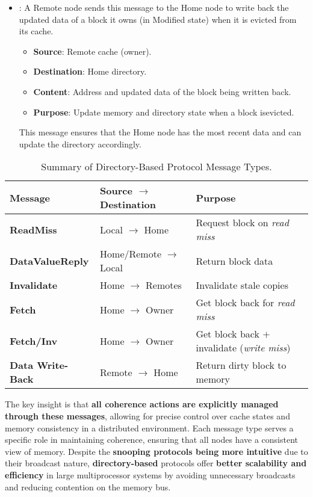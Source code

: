 \begin{itemize}
    \item {}: A Remote node sends this message to the Home node to write back the updated data of a block it owns (in Modified state) when it is evicted from its cache.
    \begin{itemize}
        \item[\textcolor{Green3}{\faIcon{arrow-right}}] \textcolor{Green3}{\textbf{Source}}: Remote cache (owner).
        \item[\textcolor{Green3}{\faIcon{arrow-left}}] \textcolor{Green3}{\textbf{Destination}}: Home directory.
        \item[\textcolor{Green3}{\faIcon{file-alt}}] \textcolor{Green3}{\textbf{Content}}: Address and updated data of the block being written back.
        \item[\textcolor{Green3}{\faIcon{question-circle}}] \textcolor{Green3}{\textbf{Purpose}}: Update memory and directory state when a block is\break evicted.
    \end{itemize}
    This message ensures that the Home node has the most recent data and can update the directory accordingly.
\end{itemize}

\begin{table}[!htp]
    \centering
    \begin{tabular}{@{} l l p{10em} @{}}
        \toprule
        Message                     & Source $\to$ Destination  & Purpose \\
        \midrule
        \textbf{ReadMiss}           & Local $\to$ Home          & Request block on \emph{read miss} \\[.3em]
        \textbf{DataValueReply}     & Home/Remote $\to$ Local   & Return block data \\[.3em]
        \textbf{Invalidate}         & Home $\to$ Remotes        & Invalidate stale copies \\[.3em]
        \textbf{Fetch}              & Home $\to$ Owner          & Get block back for \emph{read miss} \\[.3em]
        \textbf{Fetch/Inv}          & Home $\to$ Owner          & Get block back $+$ invalidate (\emph{write miss}) \\[.3em]
        \textbf{Data Write-Back}    & Remote $\to$ Home         & Return dirty block to memory \\
        \bottomrule
    \end{tabular}
    \caption{Summary of Directory-Based Protocol Message Types.}
\end{table}

\highspace
The key insight is that \textbf{all coherence actions are explicitly managed through these messages}, allowing for precise control over cache states and memory consistency in a distributed environment. Each message type serves a specific role in maintaining coherence, ensuring that all nodes have a consistent view of memory. Despite the \textbf{snooping protocols being more intuitive} due to their broadcast nature, \textbf{directory-based} protocols offer \textbf{better scalability and efficiency} in large multiprocessor systems by avoiding unnecessary broadcasts and reducing contention on the memory bus.